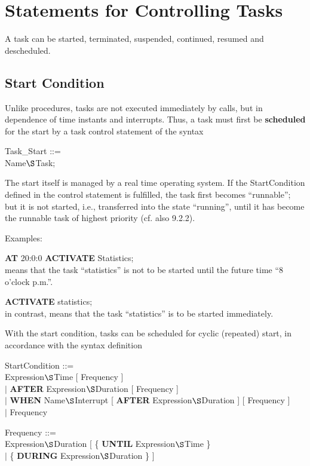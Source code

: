 \section{Statements for Controlling Tasks}    %

A task can be started, terminated, suspended, continued, resumed and
descheduled.

\subsection{Start Condition}   %

Unlike procedures, tasks are not executed immediately by calls, but in
dependence of time instants and interrupts. Thus, a task must first be
{\bf scheduled} for the start by a task control statement of the
syntax

Task\_Start ::= \\
 Name$\S $Task;

The start itself is managed by a real time operating system. If
the StartCondition defined in the control statement is fulfilled,
the task first becomes ``runnable''; but it is not started, i.e.,
transferred into the state ``running'', until it has become the runnable
task of highest priority (cf. also 9.2.2).

Examples:

{\bf AT} 20:0:0 {\bf ACTIVATE} Statistics;\\
\x means that the task ``statistics'' is not to be started until the
future time ``8 o'clock p.m.''.

{\bf ACTIVATE} statistics;\\
\x in contrast, means that the task ``statistics'' is to be started
immediately.

With the start condition, tasks can be scheduled for cyclic (repeated)
start, in accordance with the syntax definition

StartCondition ::=\\
 Expression$\S $Time [ Frequency ]\\
\x $\mid$ {\bf AFTER} Expression$\S $Duration [ Frequency ]\\
\x $\mid$ {\bf WHEN} Name$\S $Interrupt [ {\bf AFTER} Expression$\S $Duration ] [ Frequency ]\\
\x $\mid$ Frequency

Frequency ::= \\
 Expression$\S $Duration [ \{ {\bf UNTIL} Expression$\S $Time \}\\
\x $\mid$ \{ {\bf DURING} Expression$\S $Duration \} ]

